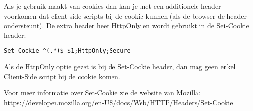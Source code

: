 Als je gebruik maakt van cookies dan kan je met een additionele header voorkomen dat client-side scripts bij de cookie kunnen (als de browser de header ondersteunt). De extra header heet HttpOnly en wordt gebruikt in de Set-Cookie header:

\begin{lstlisting}
Set-Cookie ^(.*)$ $1;HttpOnly;Secure
\end{lstlisting}
Als de HttpOnly optie gezet is bij de Set-Cookie header, dan mag geen enkel Client-Side script bij de cookie komen.

Voor meer informatie over Set-Cookie zie de website van Mozilla: \url{https://developer.mozilla.org/en-US/docs/Web/HTTP/Headers/Set-Cookie}
